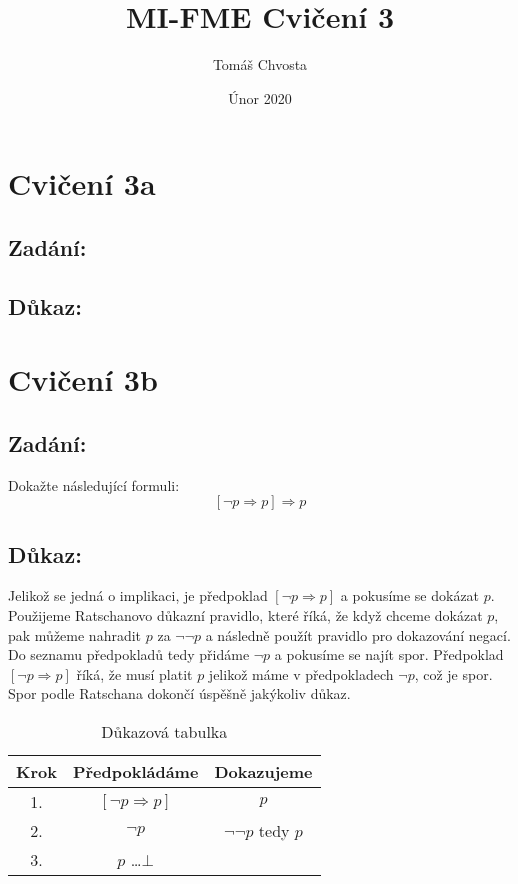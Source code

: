 \documentclass{article}
\title{MI-FME Cvičení 3}
\author{Tomáš Chvosta}
\date{Únor 2020}
\begin{document}
\maketitle

\section{Cvičení 3a}

\subsection{Zadání:}

\subsection{Důkaz:}

\section{Cvičení 3b}

\subsection{Zadání:}
Dokažte následující formuli:
$$[\neg p \Rightarrow p] \Rightarrow p$$

\subsection{Důkaz:}
Jelikož se jedná o implikaci, je předpoklad $[\neg p \Rightarrow p]$ a pokusíme se dokázat $p$. Použijeme Ratschanovo důkazní pravidlo, které říká, že když chceme dokázat $p$, pak můžeme nahradit $p$ za $\neg \neg p$ a následně použít pravidlo pro dokazování negací. Do seznamu předpokladů tedy přidáme $\neg p$ a pokusíme se najít spor. Předpoklad $[\neg p \Rightarrow p]$ říká, že musí platit $p$ jelikož máme v předpokladech $\neg p$, což je spor. Spor podle Ratschana dokončí úspěšně jakýkoliv důkaz.

\begin{table}[H]\centering

    \caption{Důkazová tabulka}

\begin{tabular}{|c|c|c|}
    
    
        \hline \textbf{Krok} & \textbf{Předpokládáme} & \textbf{Dokazujeme} \\ \hline \hline
    	1. & $[\neg p \Rightarrow p]$ & $p$ \\ \hline
    	2. & $\neg p$ & $\neg \neg p$ tedy $p$ \\ \hline
    	3. & $p$ \dots $\bot$ & \\ \hline
    
            
    	\end{tabular}
\end{table}
\end{document}
